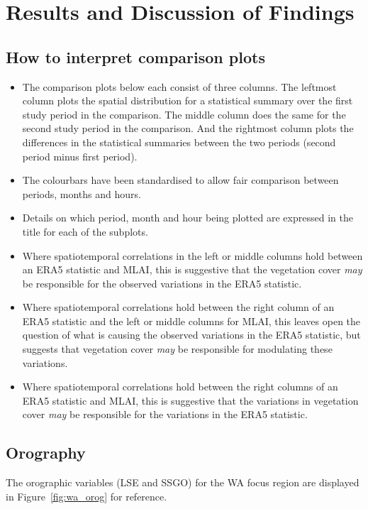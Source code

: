 \chapter{Results and Discussion of Findings}
\label{ch:results}

\section{How to interpret comparison plots}

\begin{itemize}
	\item The comparison plots below each consist of three columns. The leftmost column plots the spatial distribution for a statistical summary over the first study period in the comparison. The middle column does the same for the second study period in the comparison. And the rightmost column plots the differences in the statistical summaries between the two periods (second period minus first period).
	\item The colourbars have been standardised to allow fair comparison between periods, months and hours.
	\item Details on which period, month and hour being plotted are expressed in the title for each of the subplots.
	\item Where spatiotemporal correlations in the left or middle columns hold between an ERA5 statistic and MLAI, this is suggestive that the vegetation cover \textit{may} be responsible for the observed variations in the ERA5 statistic.
	\item Where spatiotemporal correlations hold between the right column of an ERA5 statistic and the left or middle columns for MLAI, this leaves open the question of what is causing the observed variations in the ERA5 statistic, but suggests that vegetation cover \textit{may} be responsible for modulating these variations.
	\item Where spatiotemporal correlations hold between the right columns of an ERA5 statistic and MLAI, this is suggestive that the variations in vegetation cover \textit{may} be responsible for the variations in the ERA5 statistic.
\end{itemize}

\section{Orography}

The orographic variables (\ac{LSE} and \ac{SSGO}) for the \ac{WA} focus region are displayed in Figure~\ref{fig:wa_orog} for reference.

